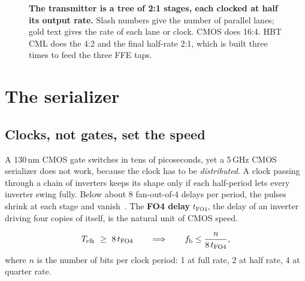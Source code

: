 \begin{figure}[tbp]
\caption{\textbf{The \OS{} transmitter is a tree of 2:1 stages, each clocked at half its output rate.} Slash numbers give the number of parallel lanes; gold text gives the rate of each lane or clock. CMOS does 16:4. HBT CML does the 4:2 and the final half-rate 2:1, which is built three times to feed the three FFE taps.}
\label{fig:ch9-arch}
\end{figure}

\section{The serializer}\label{sec:serializer}

\subsection{Clocks, not gates, set the speed}

A 130\,nm CMOS gate switches in tens of picoseconds, yet a 5\,GHz CMOS serializer does not work, because the clock has to be \emph{distributed}. A clock passing through a chain of inverters keeps its shape only if each half-period lets every inverter swing fully. Below about 8 fan-out-of-4 delays per period, the pulses shrink at each stage and vanish~\cite{palermo720ckt}. The \textbf{FO4 delay} $t_\mathrm{FO4}$, the delay of an inverter driving four copies of itself, is the natural unit of CMOS speed.

\begin{keyeq}
\begin{equation}
  T_\mathrm{clk}\ \ge\ 8\,t_\mathrm{FO4}\qquad\Longrightarrow\qquad \fb \le \frac{n}{8\,t_\mathrm{FO4}},
  \label{eq:ch9-fo4}
\end{equation}
where $n$ is the number of bits per clock period: 1 at full rate, 2 at half rate, 4 at quarter rate.
\end{keyeq}

